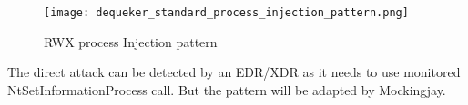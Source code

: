 \begin{figure}[ht]
\texttt{[image: dequeker\_standard\_process\_injection\_pattern.png]}
\caption{RWX process Injection pattern \autocite{Dequeker:2023}}
\end{figure}
 
The direct attack can be detected by an EDR/XDR as it needs to use monitored NtSetInformationProcess call.  But the pattern
will be adapted by Mockingjay.















